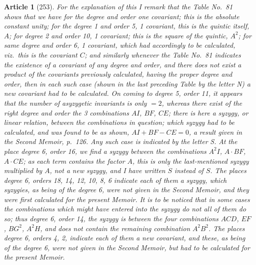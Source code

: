 \documentclass[11pt,a4paper]{article}
\theoremstyle{cayley}
\newtheorem{art}{Article}
\begin{document}
\begin{art}[253]
For the explanation of this I remark that the Table No.~81 shows that we have for the degree and order one covariant; this is the absolute constant unity; for the degree 1 and order 5, 1 covariant, this is the quintic itself, $A$; for degree 2 and order 10, 1 covariant; this is the square of the quintic, $A^2$; for same degree and order 6, 1 covariant, which had accordingly to be calculated, viz.\ this is the covariant $C$; and similarly whenever the Table No.~81 indicates the existence of a covariant of any degree and order, and there does not exist a product of the covariants previously calculated, having the proper degree and order, then in each such case (shown in the last preceding Table by the letter N) a new covariant had to be calculated. On coming to degree 5, order 11, it appears that the number of asyzygetic invariants is only $=2$, whereas there exist of the right degree and order the 3 combinations $AI$, $BF$, $CE$; there is here a syzygy, or linear relation, between the combinations in question; which syzygy had to be calculated, and was found to be as shown, $AI+BF-CE=0$, a result given in the Second Memoir, p.~126. Any such case is indicated by the letter S. At the place degree 6, order 16, we find a syzygy between the combinations $A^2I$, $A\cdot BF$, $A\cdot CE$; as each term contains the factor $A$, this is only the last-mentioned syzygy multiplied by $A$, not a new syzygy, and I have written $\dot{S}$ instead of $S$. The places degree 6, orders 18, 14, 12, 10, 8, 6 indicate each of them a syzygy, which syzygies, as being of the degree 6, were not given in the Second Memoir, and they were first calculated for the present Memoir. It is to be noticed that in some cases the combinations which might have entered into the syzygy do not all of them do so; thus degree 6, order 14, the syzygy is between the four combinations $ACD$, $EF$, $BG^2$, $A^2H$, and does not contain the remaining combination $A^2B^2$. The places degree 6, orders 4, 2, indicate each of them a new covariant, and these, as being of the degree 6, were not given in the Second Memoir, but had to be calculated for the present Memoir.
\end{art}
\end{document}
